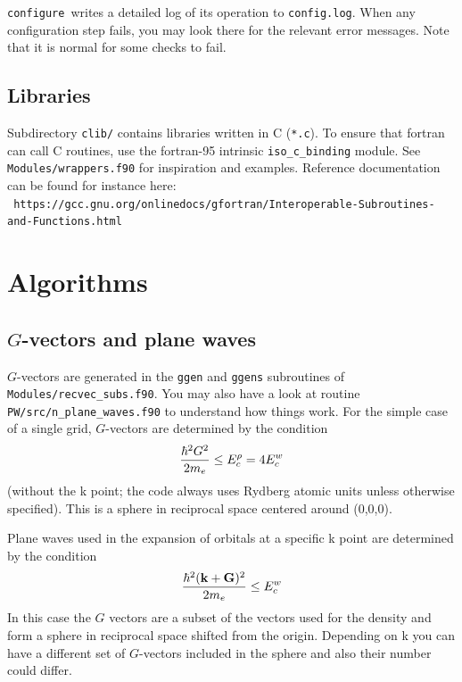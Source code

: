\documentclass[12pt,a4paper]{article}
\def\configure{\texttt{configure}}
\begin{document}
\configure\ writes a detailed log of its operation to \texttt{config.log}.
When any configuration step fails, you may look there for the relevant
error messages.  Note that it is normal for some checks to fail.


\subsection{Libraries}

Subdirectory \texttt{clib/} contains libraries written in C
(\texttt{*.c}). To ensure that fortran can call C routines,
use the fortran-95 intrinsic \texttt{iso\_c\_binding} module.
See \texttt{Modules/wrappers.f90} for inspiration and examples.
Reference documentation can be found for instance here:\\
{\tt
https://gcc.gnu.org/onlinedocs/gfortran/Interoperable-Subroutines-and-Functions.html}



\section{Algorithms}

\subsection{$G$-vectors and plane waves}

$G$-vectors are generated in the \texttt{ggen} and \texttt{ggens}
subroutines of \texttt{Modules/recvec\_subs.f90}. You may also have
a look at routine \texttt{PW/src/n\_plane\_waves.f90} to understand
how things work. For the simple case of a single grid,
$G$-vectors are determined by the condition
\begin{equation}
  { \hbar^2 G^2 \over 2m_e} \le E^\rho_c = 4 E^w_c
\end{equation}
(without the k point; the code always uses Rydberg atomic units unless
otherwise specified). This is a sphere in reciprocal space centered
around (0,0,0).

Plane waves used in the expansion of orbitals at a specific k point
are determined by the condition
\begin{equation}
  { \hbar^2 ({\bf k}+{\bf G})^2 \over 2m_e} \le E^w_c
\end{equation}
In this case the $G$ vectors are a subset of the vectors used for the
density and form a sphere in reciprocal space shifted from the origin.
Depending on k you can have a different set of $G$-vectors included
in the sphere and also their number could differ.
\end{document}
